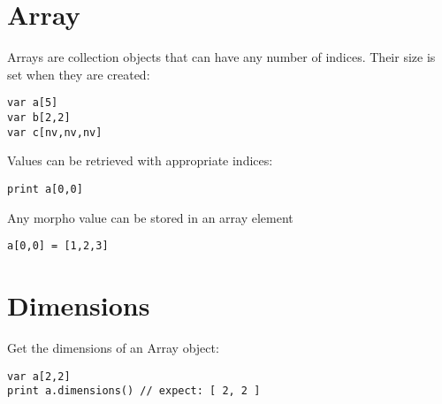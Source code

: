 \hypertarget{array}{%
\section{Array}\label{array}}

Arrays are collection objects that can have any number of indices. Their
size is set when they are created:

\begin{lstlisting}
var a[5]
var b[2,2]
var c[nv,nv,nv]
\end{lstlisting}

Values can be retrieved with appropriate indices:

\begin{lstlisting}
print a[0,0]
\end{lstlisting}

Any morpho value can be stored in an array element

\begin{lstlisting}
a[0,0] = [1,2,3]
\end{lstlisting}

\hypertarget{dimensions}{%
\section{Dimensions}\label{dimensions}}

Get the dimensions of an Array object:

\begin{lstlisting}
var a[2,2]
print a.dimensions() // expect: [ 2, 2 ]
\end{lstlisting}
